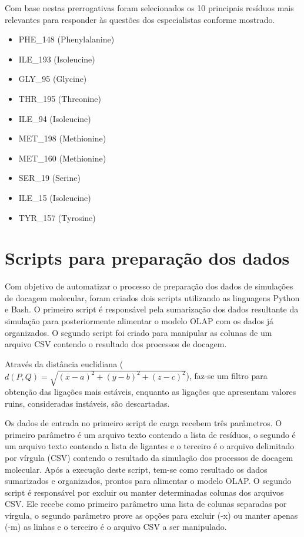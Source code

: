 Com base nestas prerrogativas foram selecionados os 10 principais resíduos mais relevantes para responder às questões dos especialistas conforme mostrado.

\begin{itemize}
	\item PHE\_148 (Phenylalanine)
	\item ILE\_193 (Isoleucine)
	\item GLY\_95 (Glycine)
	\item THR\_195 (Threonine)
	\item ILE\_94 (Isoleucine)
	\item MET\_198 (Methionine)
	\item MET\_160 (Methionine)
	\item SER\_19 (Serine)
	\item ILE\_15 (Isoleucine)
	\item TYR\_157 (Tyrosine)
\end{itemize}

\section{Scripts para preparação dos dados}
\label{sec:ScriptsParaPreparacaoDosDados}

Com objetivo de automatizar o processo de preparação dos dados de simulações de docagem molecular, foram criados dois scripts utilizando as linguagens Python e Bash. O primeiro script é responsável pela sumarização dos dados resultante da simulação para posteriormente alimentar o modelo OLAP com os dados já organizados. O segundo script foi criado para manipular as colunas de um arquivo CSV contendo o resultado dos processos de docagem.

Através da distância euclidiana ($d(P, Q)= \sqrt{(x - a)^{2} +(y - b)^{2} + (z - c)^{2}}$), faz-se um filtro para obtenção das ligações mais estáveis, enquanto as ligações que apresentam valores ruins, consideradas instáveis, são descartadas.

Os dados de entrada no primeiro script de carga recebem três parâmetros. O primeiro parâmetro é um arquivo texto contendo a lista de resíduos, o segundo é um arquivo texto contendo a lista de ligantes e o terceiro é o arquivo delimitado por vírgula (CSV) contendo o resultado da simulação dos processos de docagem molecular. Após a execução deste script, tem-se como resultado os dados sumarizados e organizados, prontos para alimentar o modelo OLAP. O segundo script é responsável por excluir ou manter determinadas colunas dos arquivos CSV. Ele recebe como primeiro parâmetro uma lista de colunas separadas por vírgula, o segundo parâmetro prove as opções para excluir (-x) ou manter apenas (-m) as linhas e o terceiro é o arquivo CSV a ser manipulado.

